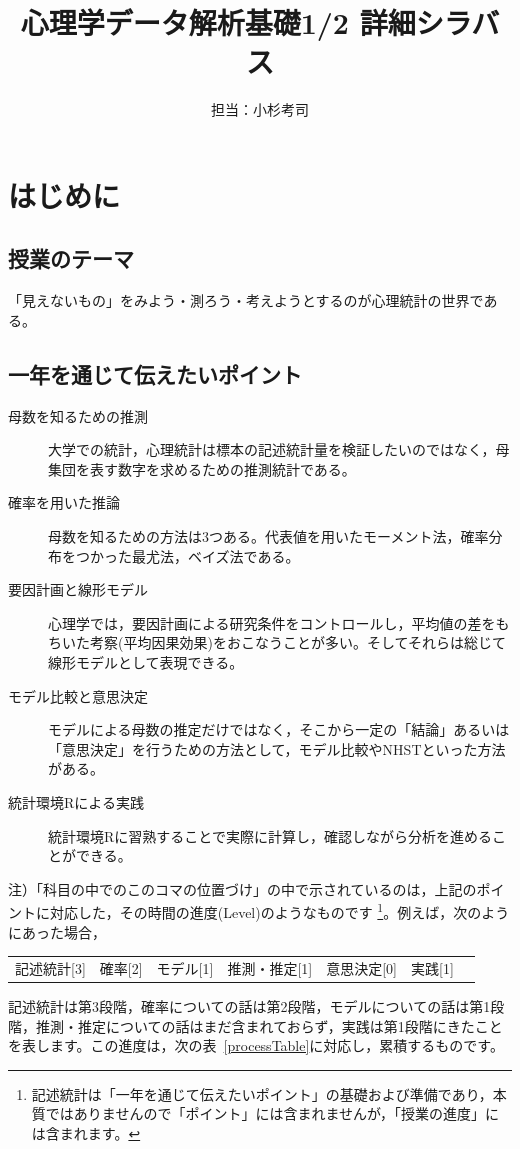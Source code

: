 \documentclass[uplatex]{jsarticle}
\begin{document}
\title{心理学データ解析基礎1/2 詳細シラバス}
\author{担当：小杉考司}
\maketitle
\setcounter{tocdepth}{1}
\tableofcontents
\newpage
\section*{はじめに}
\subsection*{授業のテーマ}

「見えないもの」をみよう・測ろう・考えようとするのが心理統計の世界である。

\subsection*{一年を通じて伝えたいポイント}
\begin{description}
    \item[母数を知るための推測] 大学での統計，心理統計は標本の記述統計量を検証したいのではなく，母集団を表す数字を求めるための推測統計である。
    \item[確率を用いた推論] 母数を知るための方法は3つある。代表値を用いたモーメント法，確率分布をつかった最尤法，ベイズ法である。
    \item[要因計画と線形モデル] 心理学では，要因計画による研究条件をコントロールし，平均値の差をもちいた考察(平均因果効果)をおこなうことが多い。そしてそれらは総じて線形モデルとして表現できる。
    \item[モデル比較と意思決定] モデルによる母数の推定だけではなく，そこから一定の「結論」あるいは「意思決定」を行うための方法として，モデル比較やNHSTといった方法がある。
    \item[統計環境Rによる実践] 統計環境Rに習熟することで実際に計算し，確認しながら分析を進めることができる。
\end{description}

注）「科目の中でのこのコマの位置づけ」の中で示されているのは，上記のポイントに対応した，その時間の進度(Level)のようなものです
\footnote{記述統計は「一年を通じて伝えたいポイント」の基礎および準備であり，本質ではありませんので「ポイント」には含まれませんが，「授業の進度」には含まれます。}。例えば，次のようにあった場合，
\begin{screen}
\begin{tabular}[t]{ccccccc}
    記述統計[3] & 確率[2] & モデル[1] & 推測・推定[1] & 意思決定[0] & 実践[1]
\end{tabular}
\end{screen}
記述統計は第3段階，確率についての話は第2段階，モデルについての話は第1段階，推測・推定についての話はまだ含まれておらず，実践は第1段階にきたことを表します。この進度は，次の表~\ref{processTable}に対応し，累積するものです。
\end{document}
